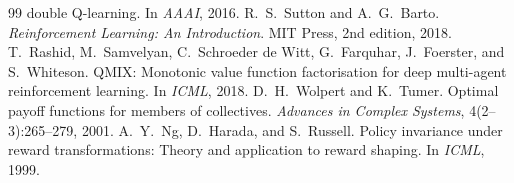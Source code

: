 \documentclass[twocolumn]{article}
\begin{document}
\begin{thebibliography}{99}
double Q-learning. In \emph{AAAI}, 2016.
 R.~S.~Sutton and A.~G.~Barto. \emph{Reinforcement Learning: An Introduction}.
MIT Press, 2nd edition, 2018.
 T.~Rashid, M.~Samvelyan, C.~Schroeder de Witt, G.~Farquhar, J.~Foerster, and
S.~Whiteson. QMIX: Monotonic value function factorisation for deep multi-agent reinforcement
learning. In \emph{ICML}, 2018.
 D.~H.~Wolpert and K.~Tumer. Optimal payoff functions for members of
collectives. \emph{Advances in Complex Systems}, 4(2--3):265--279, 2001.
 A.~Y.~Ng, D.~Harada, and S.~Russell. Policy invariance under reward transformations:
Theory and application to reward shaping. In \emph{ICML}, 1999.
\end{thebibliography}
\end{document}

